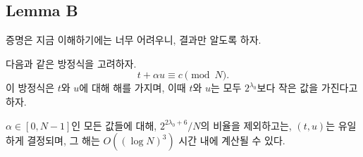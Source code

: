 \subsection{Lemma B}

증명은 지금 이해하기에는 너무 어려우니, 결과만 알도록 하자.

\begin{tcolorbox}[colback=white, sharp corners, boxrule=0.7pt]
    \begin{lemma}
        다음과 같은 방정식을 고려하자.
        $$
            t + \alpha u \equiv c \pmod{N}.
        $$
        이 방정식은 $t$와 $u$에 대해 해를 가지며, 이때 $t$와 $u$는 모두
        $2^{\lambda_0}$보다 작은 값을 가진다고 하자.

        $\alpha \in [0, N-1]$인 모든 값들에 대해, $2^{2\lambda_0 +
        6}/N$의 비율을 제외하고는, $(t, u)$는 유일하게 결정되며, 그 해는
        $O((\log N)^3)$ 시간 내에 계산될 수 있다.
    \end{lemma}
    \label{lem:small-solution}
\end{tcolorbox}

